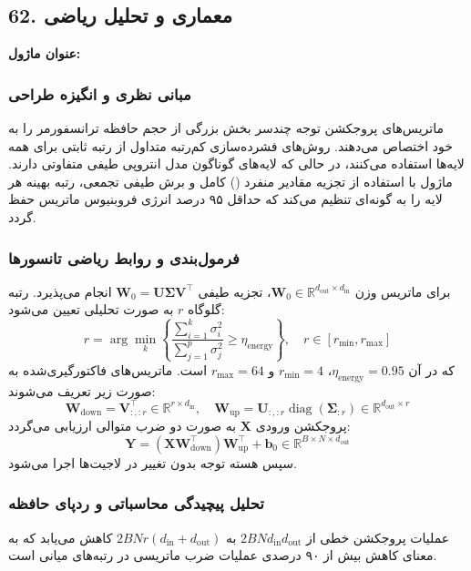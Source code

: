\subsection*{62. معماری و تحلیل ریاضی }
\textbf{عنوان ماژول:} 

\subsubsection*{مبانی نظری و انگیزه طراحی}
ماتریس‌های پروجکشن توجه چندسر بخش بزرگی از حجم حافظه ترانسفورمر را به خود اختصاص می‌دهند. روش‌های فشرده‌سازی کم‌رتبه متداول از رتبه ثابتی برای همه لایه‌ها استفاده می‌کنند، در حالی که لایه‌های گوناگون مدل انتروپی طیفی متفاوتی دارند. ماژول  با استفاده از تجزیه مقادیر منفرد () کامل و برش طیفی تجمعی، رتبه بهینه هر لایه را به گونه‌ای تنظیم می‌کند که حداقل ۹۵ درصد انرژی فروبنیوس ماتریس حفظ گردد.

\subsubsection*{فرمول‌بندی و روابط ریاضی تانسورها}
برای ماتریس وزن $\mathbf{W}_0 \in \mathbb{R}^{d_{\text{out}} \times d_{\text{in}}}$، تجزیه طیفی $\mathbf{W}_0 = \mathbf{U} \mathbf{\Sigma} \mathbf{V}^\top$ انجام می‌پذیرد. رتبه گلوگاه $r$ به صورت تحلیلی تعیین می‌شود:
\begin{equation}
r = \arg\min_k \left\{ \frac{\sum_{i=1}^k \sigma_i^2}{\sum_{j=1}^p \sigma_j^2} \ge \eta_{\text{energy}} \right\}, \quad r \in [r_{\min}, r_{\max}]
\end{equation}
که در آن $\eta_{\text{energy}} = 0.95$، $r_{\min} = 4$ و $r_{\max} = 64$ است. ماتریس‌های فاکتورگیری‌شده به صورت زیر تعریف می‌شوند:
\begin{equation}
\mathbf{W}_{\text{down}} = \mathbf{V}_{:, :r}^\top \in \mathbb{R}^{r \times d_{\text{in}}}, \quad \mathbf{W}_{\text{up}} = \mathbf{U}_{:, :r} \operatorname{diag}(\mathbf{\Sigma}_{:r}) \in \mathbb{R}^{d_{\text{out}} \times r}
\end{equation}
پروجکشن ورودی $\mathbf{X}$ به صورت دو ضرب متوالی ارزیابی می‌گردد:
\begin{equation}
\mathbf{Y} = (\mathbf{X} \mathbf{W}_{\text{down}}^\top) \mathbf{W}_{\text{up}}^\top + \mathbf{b}_0 \in \mathbb{R}^{B \times N \times d_{\text{out}}}
\end{equation}
سپس هسته توجه بدون تغییر در لاجیت‌ها اجرا می‌شود.

\subsubsection*{تحلیل پیچیدگی محاسباتی و ردپای حافظه}
عملیات پروجکشن خطی از $2 B N d_{\text{in}} d_{\text{out}}$ به $2 B N r (d_{\text{in}} + d_{\text{out}})$ کاهش می‌یابد که به معنای کاهش بیش از ۹۰ درصدی عملیات ضرب ماتریسی در رتبه‌های میانی است.



